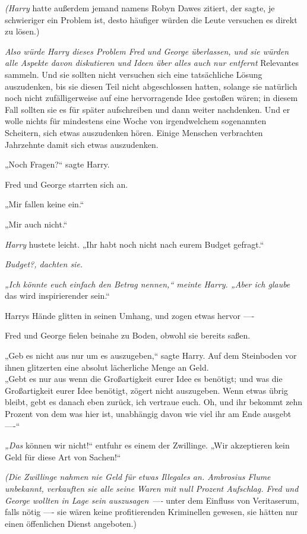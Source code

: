 {\emph{(Harry} hatte außerdem jemand namens Robyn Dawes zitiert, der sagte, je schwieriger ein Problem ist, desto häufiger würden die Leute versuchen es direkt zu lösen.)

\emph{Also würde Harry dieses Problem Fred und George überlassen, und sie würden alle Aspekte davon diskutieren und Ideen über alles auch nur entfernt} Relevantes sammeln. Und sie sollten nicht versuchen sich eine tatsächliche Lösung auszudenken, bis sie diesen Teil nicht abgeschlossen hatten, solange sie natürlich noch nicht zufälligerweise auf eine hervorragende Idee gestoßen wären; in diesem Fall sollten sie es für später aufschreiben und dann weiter nachdenken. Und er wolle nichts für mindestens eine Woche von irgendwelchem sogenannten Scheitern, sich etwas auszudenken hören. Einige Menschen verbrachten Jahrzehnte damit sich etwas auszudenken.

„Noch Fragen?“ sagte Harry.

Fred und George starrten sich an.

„Mir fallen keine ein.“

„Mir auch nicht.“

\emph{Harry} hustete leicht. „Ihr habt noch nicht nach eurem Budget gefragt.“

\emph{Budget?, dachten sie.}

\emph{„Ich könnte euch einfach den Betrag nennen,“ meinte Harry. „Aber ich glaube} das wird inspirierender sein.“

Harrys Hände glitten in seinen Umhang, und zogen etwas hervor ----

Fred und George fielen beinahe zu Boden, obwohl sie bereits saßen.

„Geb es nicht aus nur um es auszugeben,“ sagte Harry. Auf dem Steinboden vor ihnen glitzerten eine absolut lächerliche Menge an Geld.\\ „Gebt es nur aus wenn die Großartigkeit eurer Idee es benötigt; und was die Großartigkeit eurer Idee benötigt, zögert nicht auszugeben. Wenn etwas übrig bleibt, gebt es danach eben zurück, ich vertraue euch. Oh, und ihr bekommt zehn Prozent von dem was hier ist, unabhängig davon wie viel ihr am Ende ausgebt ----“

\emph{„Das} können wir nicht!“ entfuhr es einem der Zwillinge. „Wir akzeptieren kein Geld für diese Art von Sachen!“

\emph{(Die Zwillinge nahmen nie Geld für etwas Illegales an. Ambrosius Flume unbekannt, verkauften sie alle seine Waren mit null Prozent Aufschlag. Fred und George wollten in Lage sein auszusagen ----} unter dem Einfluss von Veritaserum, falls nötig ---- sie wären keine profitierenden Kriminellen gewesen, sie hätten nur einen öffenlichen Dienst angeboten.)

}
